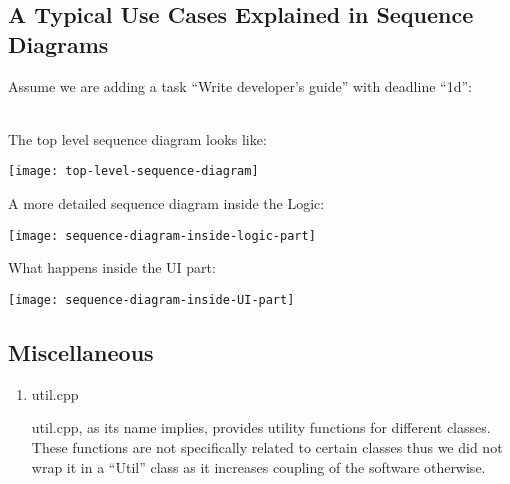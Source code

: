 \documentclass[12pt, a4paper]{article}
\begin{document}
\subsection{A Typical Use Cases Explained in Sequence Diagrams}
Assume we are adding a task ``Write developer’s guide'' with deadline ``1d'':

\\The top level sequence diagram looks like:
\begin{center}
  \texttt{[image: top-level-sequence-diagram]}
\end{center}

A more detailed sequence diagram inside the Logic:
\begin{center}
  \texttt{[image: sequence-diagram-inside-logic-part]}
\end{center}

What happens inside the UI part:
\begin{center}
  \texttt{[image: sequence-diagram-inside-UI-part]}
\end{center}

\subsection{Miscellaneous}
\begin{enumerate}
\item util.cpp

util.cpp, as its name implies, provides utility functions for different classes.
These functions are not specifically related to certain classes thus we did not wrap it in a ``Util'' class as it increases
coupling of the software otherwise.

\end{enumerate}
\end{document}
